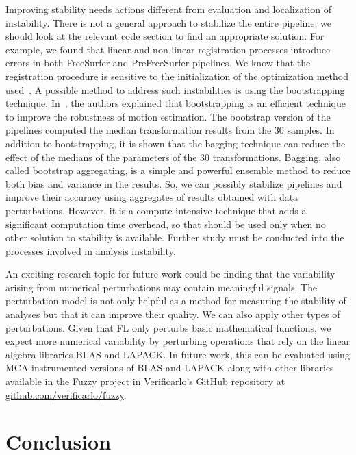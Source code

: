 Improving stability needs actions different from evaluation and localization of instability.
There is not a general approach to stabilize the entire pipeline; we should look at the relevant code section
to find an appropriate solution. For example, we found that linear and non-linear registration processes introduce errors
in both FreeSurfer and PreFreeSurfer pipelines. We know that the registration procedure is sensitive to
the initialization of the optimization method used~\cite{Glatard2018hbm}. 
A possible method to address such instabilities is using the bootstrapping technique.
In~\cite{Glatard2018hbm}, the authors explained that bootstrapping is an efficient technique to improve
the robustness of motion estimation. The bootstrap version of the pipelines computed the median transformation
results from the 30 samples. In addition to bootstrapping, it is shown that the bagging technique can
reduce the effect of the medians of the parameters of the 30 transformations. Bagging, also called bootstrap
aggregating, is a simple and powerful ensemble method to reduce both bias and variance in the results.
So, we can possibly stabilize pipelines and improve their accuracy using aggregates of results obtained with
data perturbations. However, it is a compute-intensive technique that adds a significant computation time overhead,
so that should be used only when no other solution to stability is available.  
Further study must be conducted into the processes involved in analysis instability.

An exciting research topic for future work could be finding that the variability arising from numerical perturbations may contain
meaningful signals. The perturbation model is not only helpful as a method for measuring
the stability of analyses but that it can improve their quality. 
We can also apply other types of perturbations.
Given that FL only perturbs basic mathematical functions, we expect more numerical variability
by perturbing operations that rely on the linear algebra libraries BLAS and LAPACK.
In future work, this can be evaluated using MCA-instrumented
versions of BLAS and LAPACK along with other libraries available in the Fuzzy project in Verificarlo’s
GitHub repository at \url{github.com/verificarlo/fuzzy}.

\section{Conclusion}

